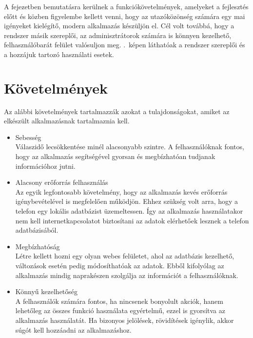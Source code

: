 
A fejezetben bemutatásra kerülnek a funkciókövetelmények, amelyeket a fejlesztés előtt és közben figyelembe kellett venni, hogy az utazóközönség számára egy mai igényeket kielégítő, modern alkalmazás készüljön el.  
Cél volt továbbá, hogy a rendszer másik szereplői, az adminisztrátorok számára is könnyen kezelhető, felhasználóbarát felület valósuljon meg. %
.\ képen láthatóak a rendszer szereplői és a hozzájuk tartozó használati esetek. 


\section{Követelmények}
\label{kovetelmeny}

Az alábbi követelmények tartalmazzák azokat a tulajdonságokat, amiket az elkészült alkalmazásnak tartalmaznia kell.

\begin{itemize}
	\item Sebesség
	\\
	Válaszidő lecsökkentése minél alacsonyabb szintre. 
	A felhasználóknak fontos, hogy az alkalmazás segítségével gyorsan és megbízhatóan tudjanak információhoz jutni. 
	\item Alacsony erőforrás felhasználás
	\\
	Az egyik legfontosabb követelmény, hogy az alkalmazás kevés erőforrás igénybevételével is megfelelően működjön. 
	Ehhez szükség volt arra, hogy a telefon egy lokális adatbázist üzemeltessen. 
	Így az alkalmazás használatakor nem kell internetkapcsolatot biztosítani az adatok elérhetőek lesznek a telefon adatbázisából.	
	\item Megbízhatóság
	\\
	Létre kellett hozni egy olyan webes felületet, ahol az adatbázis kezelhető, változások esetén pedig módosíthatóak az adatok. 
	Ebből kifolyólag az alkalmazás mindig naprakészen szolgálja az információt a felhasználóknak.
	\item Könnyű kezelhetőség
	\\
	A felhasználók számára fontos, ha nincsenek bonyolult akciók, hanem lehetőleg az összes funkció használata egyértelmű, ezzel is gyorsítva az alkalmazás használatát. 
	Ha bizonyos jelölések, rövidítések igénylik, akkor súgót kell hozzáadni az alkalmazáshoz.
	
\end{itemize}


